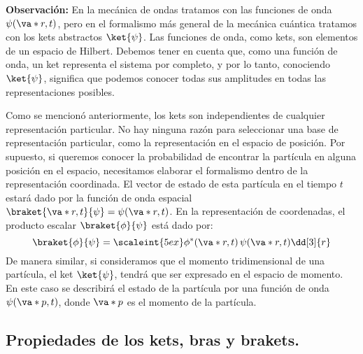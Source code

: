 \textbf{Observación:} En la mecánica de ondas tratamos con las funciones de onda $\psi(\va*{r}, t)$, pero en el formalismo más general de la mecánica cuántica tratamos con los kets abstractos $\ket{\psi}$. Las funciones de onda, como kets, son elementos de un espacio de Hilbert. Debemos tener en cuenta que, como una función de onda, un ket representa el sistema por completo, y por lo tanto, conociendo $\ket{\psi}$, significa que podemos conocer todas sus amplitudes en todas las representaciones posibles.
\par
Como se mencionó anteriormente, los kets son independientes de cualquier representación particular. No hay ninguna razón para seleccionar una base de representación particular, como la representación en el espacio de posición. Por supuesto, si queremos conocer la probabilidad de encontrar la partícula en alguna posición en el espacio, necesitamos elaborar el formalismo dentro de la representación coordinada. El vector de estado de esta partícula en el tiempo $t$ estará dado por la función de onda espacial $\braket{\va*{r}, t}{\psi} = \psi(\va*{r}, t)$. En la representación de coordenadas, el producto escalar $\braket{\phi}{\psi}$ está dado por:
\begin{equation}
\braket{\phi}{\psi} = \scaleint{5ex} \phi^{*}(\va*{r}, t) \, \psi(\va*{r}, t) \dd[3]{r}
\label{eq:ecuacion_02_25}
\end{equation}
De manera similar, si consideramos que el momento tridimensional de una partícula, el ket $\ket{\psi}$, tendrá que ser expresado en el espacio de momento. En este caso se describirá el estado de la partícula por una función de onda $\psi( \va*{p}, t)$, donde $\va*{p}$ es el momento de la partícula.

\subsection{Propiedades de los kets, bras y brakets.}

